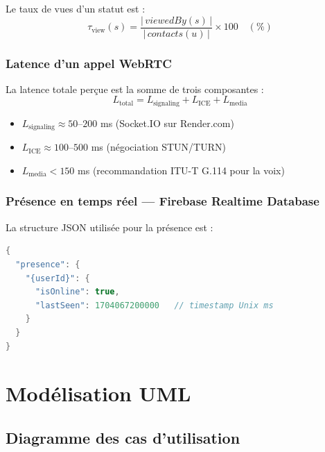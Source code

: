 \documentclass[12pt,a4paper]{report}
\begin{document}
Le taux de vues d'un statut est :
\[
  \tau_{\text{view}}(s) = \frac{|\,viewedBy(s)\,|}{|\,contacts(u)\,|} \times 100 \quad (\%)
\]

\subsection{Latence d'un appel WebRTC}

La latence totale perçue est la somme de trois composantes :
\[
  L_{\text{total}} = L_{\text{signaling}} + L_{\text{ICE}} + L_{\text{media}}
\]
\begin{itemize}[noitemsep]
  \item $L_{\text{signaling}} \approx 50$--$200$ ms (Socket.IO sur Render.com)
  \item $L_{\text{ICE}} \approx 100$--$500$ ms (négociation STUN/TURN)
  \item $L_{\text{media}} < 150$ ms (recommandation ITU-T G.114 pour la voix)
\end{itemize}

\subsection{Présence en temps réel --- Firebase Realtime Database}

La structure JSON utilisée pour la présence est :
\begin{lstlisting}[language=Java,caption={Structure Realtime Database pour la présence}]
{
  "presence": {
    "{userId}": {
      "isOnline": true,
      "lastSeen": 1704067200000   // timestamp Unix ms
    }
  }
}
\end{lstlisting}

\chapter{Modélisation UML}

\section{Diagramme des cas d'utilisation}
\end{document}
